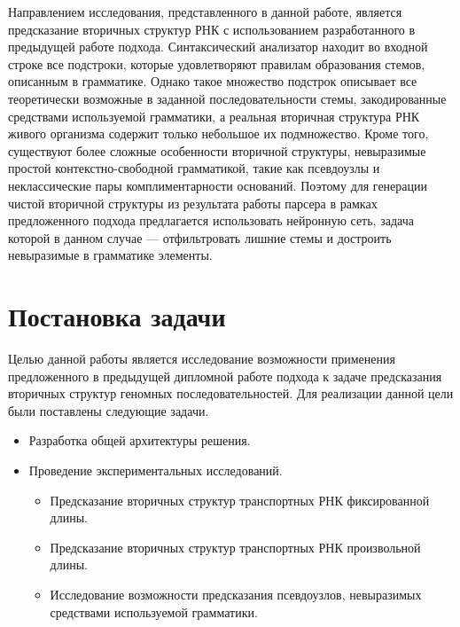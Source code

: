 \documentclass[14pt]{matmex-diploma-custom}
\begin{document}
Направлением исследования, представленного в данной работе, является предсказание вторичных структур РНК с использованием разработанного в предыдущей работе подхода. Синтаксический анализатор находит во входной строке все подстроки, которые удовлетворяют правилам образования стемов, описанным в грамматике. Однако такое множество подстрок описывает все теоретически возможные в заданной последовательности стемы, закодированные средствами используемой грамматики, а реальная вторичная структура РНК живого организма содержит только небольшое их подмножество. Кроме того, существуют более сложные особенности вторичной структуры, невыразимые простой контекстно-свободной грамматикой, такие как псевдоузлы и неклассические пары комплиментарности оснований. Поэтому для генерации чистой вторичной структуры из результата работы парсера в рамках предложенного подхода предлагается использовать нейронную сеть, задача которой в данном случае --- отфильтровать лишние стемы и достроить невыразимые в грамматике элементы.

\section{Постановка задачи}
Целью данной работы является исследование возможности применения предложенного в предыдущей дипломной работе подхода к задаче предсказания вторичных структур геномных последовательностей. Для реализации данной цели были поставлены следующие задачи.
\begin{itemize}
    \item Разработка общей архитектуры решения.
    \item Проведение экспериментальных исследований.
    \begin{itemize}
        \item Предсказание вторичных структур транспортных РНК фиксированной длины.
        \item Предсказание вторичных структур транспортных РНК произвольной длины.
        \item Исследование возможности предсказания псевдоузлов, невыразимых средствами используемой грамматики.
    \end{itemize}
\end{itemize}
\end{document}
